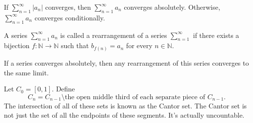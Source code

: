 \documentclass{article}
\begin{document}
    If $\sum\limits_{n=1}^\infty|a_n|$ converges, then $\sum\limits_{n=1}^\infty a_n$ converges absolutely. Otherwise, $\sum\limits_{n=1}^\infty a_n$ converges conditionally.
    
\medskip
{}

    A series $\sum\limits_{n=1}^\infty a_n$ is called a rearrangement of a series $\sum\limits_{n=1}^\infty$ if there exists a bijection $f:\mathbb N \to \mathbb N$ such that $b_{f(n)} = a_n$ for every $n \in \mathbb N$.
    
\medskip
{}

    If a series converges absolutely, then any rearrangement of this series converges to the same limit.

\medskip
{}

    Let $C_0 = [0,1]$. Define $$C_n = C_{n-1} \setminus \text{the open middle third of each separate piece of } C_{n-1}.$$ The intersection of all of these sets is known as the Cantor set. The Cantor set is not just the set of all the endpoints of these segments. It's actually uncountable.
\end{document}
